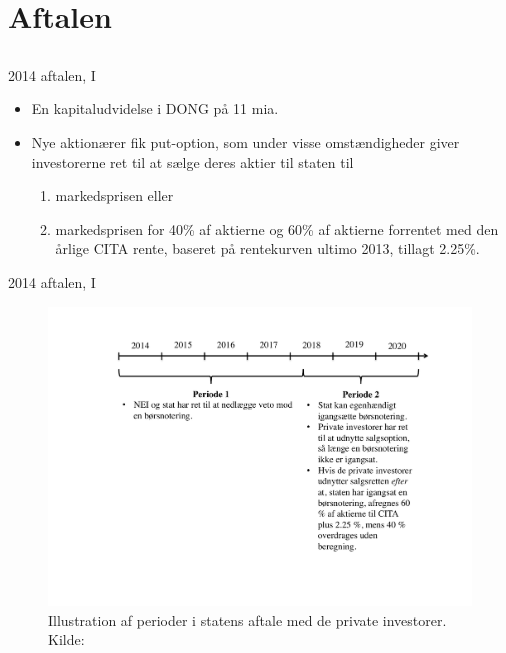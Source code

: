 \documentclass{beamer}
\begin{document}
\section{Aftalen}
\subsection{}

\begin{frame}{2014 aftalen, I}

\begin{itemize}

\item En kapitaludvidelse i DONG på 11 mia. 
\pause
\item Nye aktionærer fik put-option, som under visse omstændigheder giver investorerne ret til at sælge deres aktier til staten til
\pause
\begin{enumerate}
\item markedsprisen  eller
\pause
\item markedsprisen for 40\% af aktierne og 60\% af aktierne forrentet med den årlige CITA rente, baseret på rentekurven ultimo 2013, tillagt 2.25\%.
\end{enumerate}
\end{itemize}

\end{frame}

\begin{frame}{2014 aftalen, I}

\begin{figure}
\includegraphics[scale=0.35]{../../figs/perioder}
\caption{Illustration af perioder i statens aftale med de private investorer. Kilde: \citet{FM2013a}}
\label{fig:comp}
\end{figure}
\end{frame}
\end{document}
